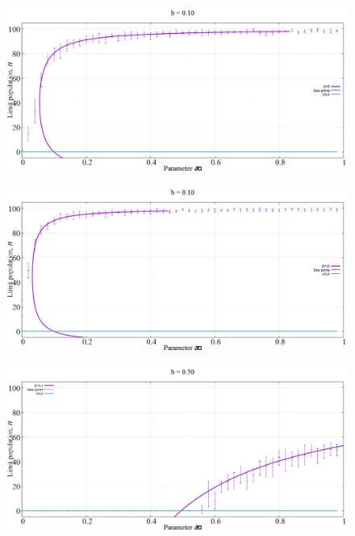 \begin{figure}[h!]
 \centering
  \includegraphics[width=\linewidth]{images/appendix/simexpt/4.png}
\end{figure}

\begin{figure}[h!]
 \centering
  \includegraphics[width=\linewidth]{images/appendix/simexpt/5.png}
\end{figure}

\begin{figure}[h!]
 \centering
  \includegraphics[width=\linewidth]{images/appendix/simexpt/6.png}
\end{figure}

